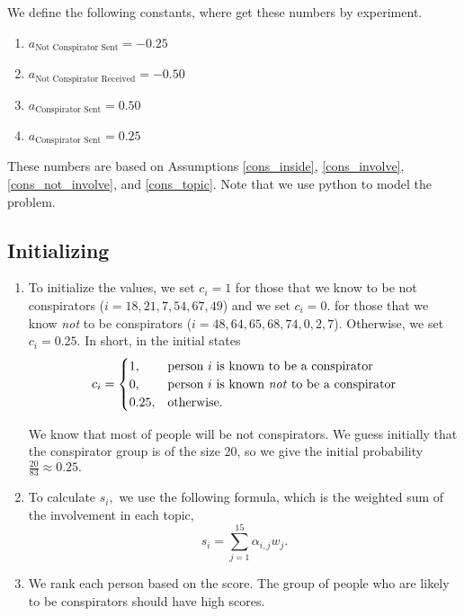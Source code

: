 \documentclass{icmmcm}
\begin{document}
We define the following constants,
where get these numbers by experiment.
\begin{enumerate}
\item $a_{\text{Not Conspirator Sent}} = -0.25$
\item $a_{\text{Not Conspirator Received}} = -0.50$
\item $a_{\text{Conspirator Sent}} = 0.50$
\item $a_{\text{Conspirator Sent}} = 0.25$
\end{enumerate}

These numbers are based on Assumptions \eqref{cons_inside}, \eqref{cons_involve}, \eqref{cons_not_involve}, and
\eqref{cons_topic}.
Note that we use python to model the problem.

\subsection{Initializing}
\begin{enumerate}
\item To initialize the values, we set $c_i = 1$ for those that
we know to be not conspirators ($i=18,21,7,54,67,49$)
and we set $c_i = 0.$ for those that
we know \textit{not} to be conspirators ($i=48,64,65,68,74,0,2,7$).
Otherwise, we set $c_i = 0.25.$ In short, in the initial states
\[c_i=
\begin{cases}
1,	& \text{person $i$ is known to be a conspirator}\\
0,	& \text{person $i$ is known \textit{not} to be a conspirator}\\
0.25,	&\text{otherwise.}
\end{cases}\]

We know that most of people will be not conspirators. 
We guess initially that the conspirator group 
is of the size 20, so we give the initial probability
$\frac{20}{83} \approx 0.25.$

\item To calculate $s_i,$ we use the following formula,
which is the weighted sum of the involvement in each topic,
\[s_i = \sum_{j=1}^{15} \alpha_{i,j} w_j.\]

\item We rank each person based on the score.
The group of people who are likely to be 
conspirators should have high scores.
\end{enumerate}
\end{document}
